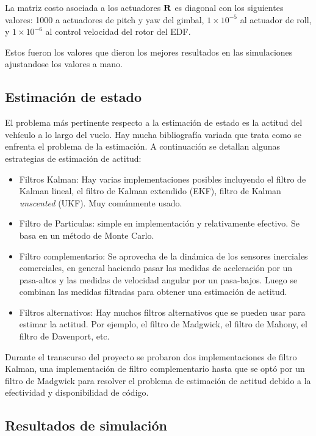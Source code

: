 \medskip

La matriz costo asociada a los actuadores $\mathbf{R}$ es diagonal con los siguientes valores: 1000 a actuadores de pitch y yaw del gimbal, $1\times10^{-5}$ al actuador de roll, y $1\times10^{-6}$ al control velocidad del rotor del EDF.

Estos fueron los valores que dieron los mejores resultados en las simulaciones ajustandose los valores a mano.

\subsection{Estimación de estado}
El problema más pertinente respecto a la estimación de estado es la actitud del vehículo a lo largo del vuelo. Hay mucha bibliografía variada que trata como se enfrenta el problema de la estimación. A continuación se detallan algunas estrategias de estimación de actitud:

\begin{itemize}
    \item Filtros Kalman: Hay varias implementaciones posibles incluyendo el filtro de Kalman lineal, el filtro de Kalman extendido (EKF), filtro de Kalman \textit{unscented} (UKF). Muy comúnmente usado.
    \item Filtro de Particulas: simple en implementación y relativamente efectivo. Se basa en un método de Monte Carlo.
    \item Filtro complementario: Se aprovecha de la dinámica de los sensores inerciales comerciales, en general haciendo pasar las medidas de aceleración por un pasa-altos y las medidas de velocidad angular por un pasa-bajos. Luego se combinan las medidas filtradas para obtener una estimación de actitud.
    \item Filtros alternativos: Hay muchos filtros alternativos que se pueden usar para estimar la actitud. Por ejemplo, el filtro de Madgwick, el filtro de Mahony, el filtro de Davenport, etc.
\end{itemize}

Durante el transcurso del proyecto se probaron dos implementaciones de filtro Kalman, una implementación de filtro complementario hasta que se optó por un filtro de Madgwick para resolver el problema de estimación de actitud debido a la efectividad y disponibilidad de código.

\subsection{Resultados de simulación}

